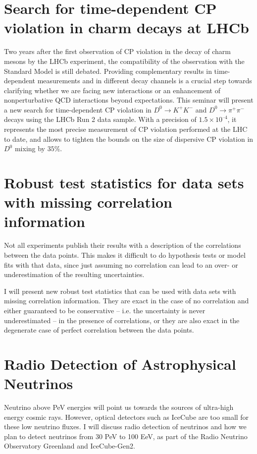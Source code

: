 \documentclass[12pt, a4paper, notitlepage, onecolumn]{article}
\begin{document}
\section{Search for time-dependent CP violation in charm decays at LHCb}
\noindent Two years after the first observation of CP violation in the decay of charm mesons by the LHCb experiment, the compatibility of the observation with the Standard Model is still debated. Providing complementary results in time-dependent measurements and in different decay channels is a crucial step towards clarifying whether we are facing new interactions or an enhancement of nonperturbative QCD interactions beyond expectations. This seminar will present a new search for time-dependent CP violation in $D^0\to K^+K^-$ and $D^0\to\pi^+\pi^-$ decays using the LHCb Run 2 data sample. With a precision of $1.5\times 10^{–4}$, it represents the most precise measurement of CP violation performed at the LHC to date, and allows to tighten the bounds on the size of dispersive CP violation in $D^0$ mixing by $35\%$.

\section{Robust test statistics for data sets with missing correlation information}
\noindent Not all experiments publish their results with a description of the correlations between the data points.  This makes it difficult to do hypothesis tests or model fits with that data, since just assuming no correlation can lead to an over- or underestimation of the resulting uncertainties.

I will present new robust test statistics that can be used with data sets with missing correlation information.  They are exact in the case of no correlation and either guaranteed to be conservative -- i.e. the uncertainty is never underestimated -- in the presence of correlations, or they are also exact in the degenerate case of perfect correlation between the data points.

\section{Radio Detection of Astrophysical Neutrinos}
\noindent Neutrino above PeV energies will point us towards the sources of ultra-high energy cosmic rays. However, optical detectors such as IceCube are too small for these low neutrino fluxes. I will discuss radio detection of neutrinos and how we plan to detect neutrinos from 30 PeV to 100 EeV, as part of the Radio Neutrino Observatory Greenland and IceCube-Gen2.
\end{document}

